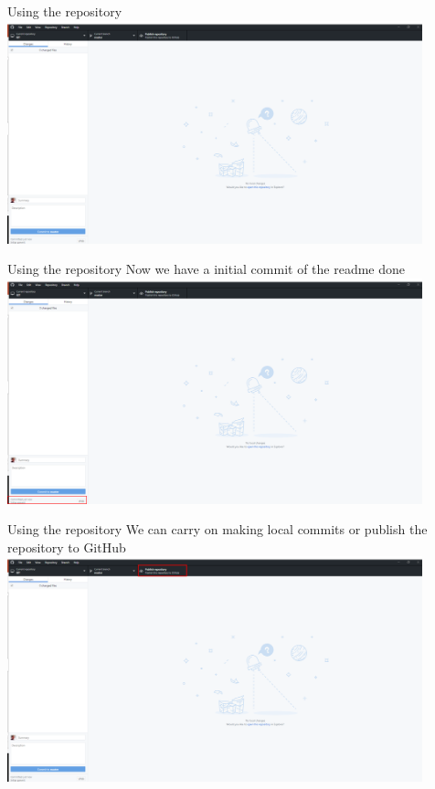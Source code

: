 \documentclass[10pt]{beamer}
\begin{document}
{\begin{frame}[fragile]{Using the repository}
\includegraphics[width=12cm]{Figs/GHD/outline_02}
\end{frame}


\begin{frame}[fragile]{Using the repository}
\small Now we have a initial commit of the readme done
\includegraphics[width=12cm]{Figs/GHD/outline_09}
\end{frame}


\begin{frame}[fragile]{Using the repository}
\small We can carry on making local commits or publish the repository to GitHub
\includegraphics[width=12cm]{Figs/GHD/outline_03}
\end{frame}

}
\end{document}
